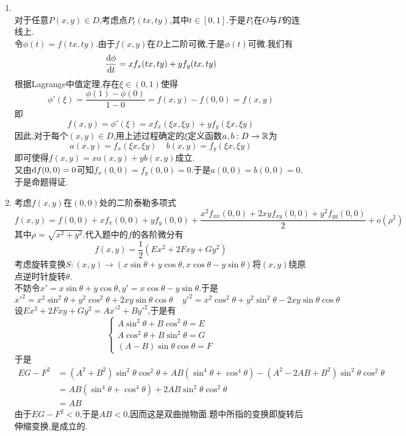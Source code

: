 \documentclass{ctexart}
\begin{document}
\begin{solution}
    \begin{enumerate}[label=\textbf{(\arabic*)},leftmargin=*]
        \item {}\\
            对于任意$P(x,y)\in D$,考虑点$P_t(tx,ty)$,其中$t\in[0,1]$.于是$P_t$在$O$与$P$的连线上.\\
            令$\phi(t)=f(tx,ty)$.由于$f(x,y)$在$D$上二阶可微,于是$\phi(t)$可微.我们有
            \[\dfrac{\mathrm{d}\phi}{\mathrm{d} t}=xf_x(tx,ty)+yf_y(tx,ty)\]
            根据Lagrange中值定理,存在$\xi\in(0,1)$使得
            \[\phi'(\xi)=\dfrac{\phi(1)-\phi(0)}{1-0}=f(x,y)-f(0,0)=f(x,y)\]
            即
            \[f(x,y)=\phi'(\xi)=xf_x(\xi x,\xi y)+yf_y(\xi x,\xi y)\]
            因此,对于每个$(x,y)\in D$,用上述过程确定的$\xi$定义函数$a,b:D\to\mathbb{R}$为
            \[a(x,y)=f_x(\xi x,\xi y)\ \ \ \ \ b(x,y)=f_y(\xi x,\xi y)\]
            即可使得$f(x,y)=xa(x,y)+yb(x,y)$成立.\\
            又由$\mathrm{d} f(0,0)=0$可知$f_x(0,0)=f_y(0,0)=0$.于是$a(0,0)=b(0,0)=0$.\\
            于是命题得证.
        \item 考虑$f(x,y)$在$(0,0)$处的二阶泰勒多项式
            \[f(x,y)=f(0,0)+xf_x(0,0)+yf_y(0,0)+\dfrac{x^2f_{xx}(0,0)+2xyf_{xy}(0,0)+y^2f_{yy}(0,0)}{2}+o(\rho^2)\]
            其中$\rho=\sqrt{x^2+y^2}$.代入题中的$f$的各阶微分有
            \[f(x,y)=\dfrac{1}{2}\left(Ex^2+2Fxy+Gy^2\right)\]
            考虑旋转变换$S:(x,y)\to(x\sin\theta+y\cos\theta,x\cos\theta-y\sin\theta)$将$(x,y)$绕原点逆时针旋转$\theta$.\\
            不妨令$x'=x\sin\theta+y\cos\theta,y'=x\cos\theta-y\sin\theta$.于是
            \[x'^2=x^2\sin^2\theta+y^2\cos^2\theta+2xy\sin\theta\cos\theta\ \ \ \ \ y'^2=x^2\cos^2\theta+y^2\sin^2\theta-2xy\sin\theta\cos\theta\]
            设$Ex^2+2Fxy+Gy^2=Ax'^2+By'^2$,于是有
            \[\left\{\begin{array}{l}
                A\sin^2\theta+B\cos^2\theta=E\\
                A\cos^2\theta+B\sin^2\theta=G\\
                (A-B)\sin\theta\cos\theta=F
            \end{array}\right.\]
            于是
            \[\begin{aligned}
                EG-F^2
                &= (A^2+B^2)\sin^2\theta\cos^2\theta+AB(\sin^4\theta+\cos^4\theta)-(A^2-2AB+B^2)\sin^2\theta\cos^2\theta \\
                &= AB(\sin^4\theta+\cos^4\theta)+2AB\sin^2\theta\cos^2\theta \\
                &= AB
            \end{aligned}\]
            由于$EG-F^2<0$,于是$AB<0$,因而这是双曲抛物面.题中所指的变换即旋转后伸缩变换,是成立的.
    \end{enumerate}
\end{solution}
\end{document}
